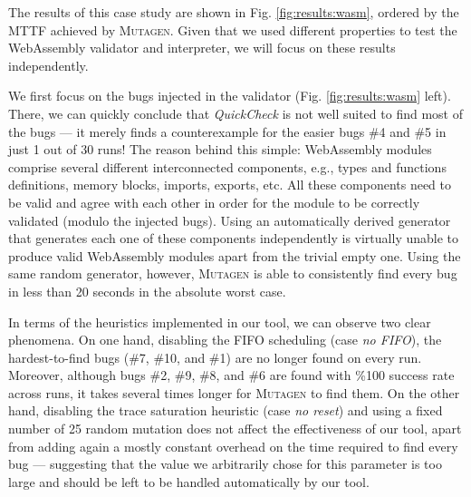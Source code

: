 \documentclass[sigconf, anonymous]{acmart}
\newcommand{\quickcheck}{\textit{QuickCheck}\xspace}
\newcommand{\mutagen}{\textsc{Mutagen}\xspace}
\begin{document}
The results of this case study are shown in Fig. \ref{fig:results:wasm}, ordered
by the MTTF achieved by \mutagen.
%
Given that we used different properties to test the WebAssembly validator and
interpreter, we will focus on these results independently.


We first focus on the bugs injected in the validator (Fig.
\ref{fig:results:wasm} left).
%
There, we can quickly conclude that \quickcheck is not well suited to find most
of the bugs --- it merely finds a counterexample for the easier bugs \#4 and \#5
in just 1 out of 30 runs!
%
The reason behind this simple: WebAssembly modules comprise several different
interconnected components, e.g., types and functions definitions, memory blocks,
imports, exports, etc.
%
All these components need to be valid and agree with each other in order for the
module to be correctly validated (modulo the injected bugs).
%
Using an automatically derived generator that generates each one of these
components independently is virtually unable to produce valid WebAssembly
modules apart from the trivial empty one.
%
Using the same random generator, however, \mutagen is able to consistently find
every bug in less than 20 seconds in the absolute worst case.


In terms of the heuristics implemented in our tool, we can observe two clear
phenomena.
%
On one hand, disabling the FIFO scheduling (case \textit{no FIFO}), the
hardest-to-find bugs (\#7, \#10, and \#1) are no longer found on every run.
%
Moreover, although bugs \#2, \#9, \#8, and \#6 are found with \%100 success rate
across runs, it takes several times longer for \mutagen to find them.
%
On the other hand, disabling the trace saturation heuristic (case \textit{no
  reset}) and using a fixed number of 25 random mutation does not affect the
effectiveness of our tool, apart from adding again a mostly constant overhead on
the time required to find every bug --- suggesting that the value we arbitrarily
chose for this parameter is too large and should be left to be handled
automatically by our tool.
\end{document}
